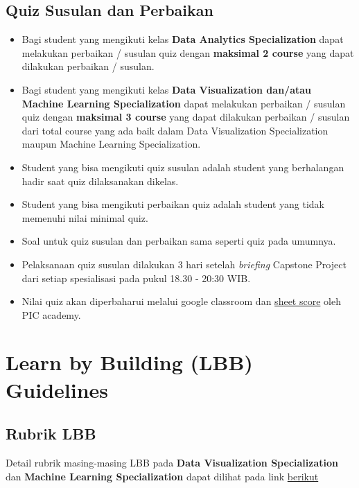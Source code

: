 \documentclass[
]{book}
\providecommand{\tightlist}{%
  \setlength{\itemsep}{0pt}\setlength{\parskip}{0pt}}
\begin{document}
\hypertarget{quiz-susulan-dan-perbaikan}{%
\subsection{Quiz Susulan dan Perbaikan}\label{quiz-susulan-dan-perbaikan}}

\begin{itemize}
\tightlist
\item
  Bagi student yang mengikuti kelas \textbf{Data Analytics Specialization} dapat melakukan perbaikan / susulan quiz dengan \textbf{maksimal 2 course} yang dapat dilakukan perbaikan / susulan.
\item
  Bagi student yang mengikuti kelas \textbf{Data Visualization dan/atau Machine Learning Specialization} dapat melakukan perbaikan / susulan quiz dengan \textbf{maksimal 3 course} yang dapat dilakukan perbaikan / susulan dari total course yang ada baik dalam Data Visualization Specialization maupun Machine Learning Specialization.
\item
  Student yang bisa mengikuti quiz susulan adalah student yang berhalangan hadir saat quiz dilaksanakan dikelas.
\item
  Student yang bisa mengikuti perbaikan quiz adalah student yang tidak memenuhi nilai minimal quiz.
\item
  Soal untuk quiz susulan dan perbaikan sama seperti quiz pada umumnya.
\item
  Pelaksanaan quiz susulan dilakukan 3 hari setelah \emph{briefing} Capstone Project dari setiap spesialisasi pada pukul 18.30 - 20:30 WIB.
\item
  Nilai quiz akan diperbaharui melalui google classroom dan \href{https://docs.google.com/spreadsheets/d/1cGJ0pn9k9gKCBnceWVwaL9D7BBDMNjLh8uPYlaBlJi8/edit?usp=sharing}{sheet score} oleh PIC academy.
\end{itemize}

\hypertarget{learn-by-building-lbb-guidelines}{%
\section{Learn by Building (LBB) Guidelines}\label{learn-by-building-lbb-guidelines}}

\hypertarget{rubrik-lbb}{%
\subsection{Rubrik LBB}\label{rubrik-lbb}}

Detail rubrik masing-masing LBB pada \textbf{Data Visualization Specialization} dan \textbf{Machine Learning Specialization} dapat dilihat pada link \href{https://rpubs.com/AlgoritmaAcademy/lbb}{berikut}
\end{document}

